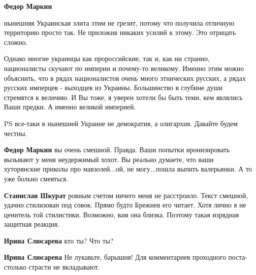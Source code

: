 \begin{itemize}
\begin{itemize}
\textbf{Федор Маркин} 

нынешняя Украинская элита этим не грезит, потому что получила отличную
территорию просто так. Не приложив никаких усилий к этому. Это отрицать сложно.

Однако многие украинцы как пророссийские, так и, как ни странно, националисты
скучают по империи и почему-то великому. Именно этим можно объяснить, что в
рядах националистов очень много этнических русских, а рядах русских имперцев -
выходцев из Украины. Большинство в глубине души стремятся к величию. И Вы тоже,
я уверен хотели бы быть теми, кем являлись Ваши предки. А именно великой
империей.

PS все-таки в нынешней Украине не демократия, а олигархия. Давайте будем
честны.

 
\textbf{Федор Маркин} вы очень смешной. Правда. Ваши попытки иронизировать вызывают у меня неудержимый хохот. Вы реально думаете, что ваши хуторянские приколы про мавзолей...ой, не могу...пошла выпить валерьянки. А то уже больно смеяться.

 
\textbf{Станислав Шкурат} ровным счетом ничего меня не расстроило. Текст смешной, удачно стилизован под совок. Прямо будто Брежнев его читает. Хотя лично я не ценитель той стилистики. Возможно, вам она близка. Поэтому такая изрядная защитная реакция.

 
\textbf{Ирина Слюсарева} кто ты?
Что ты?

 
\textbf{Ирина Слюсарева} Не лукавьте, барышня! Для комментариев проходного поста-столько страсти не вкладывают.🤣


\end{itemize}
\end{itemize}
